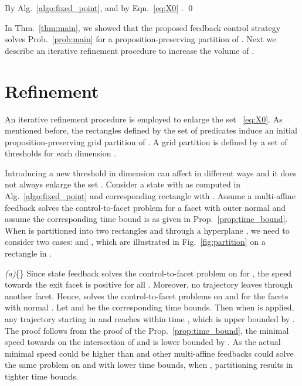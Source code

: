 \documentclass{ifacconf}
\begin{document}
By Alg.~\ref{algo:fixed_point},  and by Eqn.~\eqref{eq:X0} .
\qed


In Thm.~\ref{thm:main}, we showed that the proposed feedback control strategy solves Prob.~\ref{prob:main} for a proposition-preserving partition of .  Next we describe an iterative refinement procedure to increase the volume of .




\section{Refinement}\label{sec:optimization}
 \newcommand{\OPTVAR}{d_{i*}^{j}}
 \newcommand{\OPTVARS}{d_{i}^{j}}
 \newcommand{\OPTVARN}{d_{i+1}^{j}}
\newcommand{\NEWTH}{d^j_*}

An iterative refinement procedure is employed to enlarge the set ~\eqref{eq:X0}. 
As mentioned before, the rectangles defined by the set of predicates induce an initial proposition-preserving grid partition of . A grid partition is defined by a set of thresholds  for each dimension . 



 Introducing a new threshold  in dimension  can affect  in different ways and it does not always enlarge the set .  Consider a state  with  as computed in Alg.~\ref{algo:fixed_point} and corresponding rectangle  with .  Assume a multi-affine feedback  solves the control-to-facet problem for a facet  with outer normal  and assume the corresponding time bound is  as given in Prop.~\ref{prop:time_bound}. When  is partitioned into two rectangles  and  through a hyperplane ,  we need to consider two cases:  and , which are illustrated in Fig.~\ref{fig:partition} on a rectangle in .


  \emph{(a)}\{{\it }\} Since state feedback  solves the control-to-facet problem on  for , the speed towards the exit facet is positive for all . Moreover, no trajectory leaves  through another facet. Hence,  solves the control-to-facet problems on  and  for the facets with normal . Let  and  be the corresponding time bounds. Then when  is applied, any trajectory starting in  and  reaches  within time , which is upper bounded by . The proof follows from the proof of the Prop.~\ref{prop:time_bound}, the minimal speed towards  on the intersection of  and  is lower bounded by . As the actual minimal speed could be higher than  and other multi-affine feedbacks could solve the same problem on  and  with lower time bounds, when , partitioning results in tighter time bounds.
  
\end{document}
